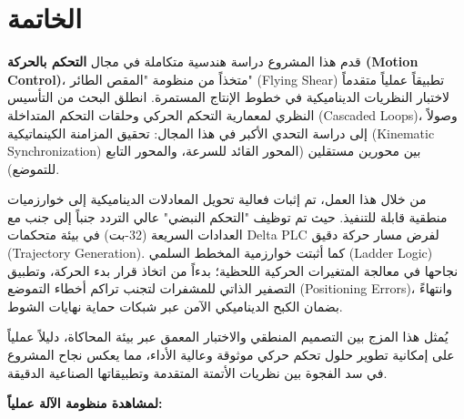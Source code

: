 \chapter{الخاتمة}
\label{ch:conclusion}


قدم هذا المشروع دراسة هندسية متكاملة في مجال \textbf{التحكم بالحركة (\textenglish{Motion Control})}، متخذاً من منظومة "المقص الطائر" (\textenglish{Flying Shear}) تطبيقاً عملياً متقدماً لاختبار النظريات الديناميكية في خطوط الإنتاج المستمرة. انطلق البحث من التأسيس النظري لمعمارية التحكم الحركي وحلقات التحكم المتداخلة (\textenglish{Cascaded Loops})، وصولاً إلى دراسة التحدي الأكبر في هذا المجال: تحقيق المزامنة الكينماتيكية (\textenglish{Kinematic Synchronization}) بين محورين مستقلين (المحور القائد للسرعة، والمحور التابع للتموضع).

من خلال هذا العمل، تم إثبات فعالية تحويل المعادلات الديناميكية إلى خوارزميات منطقية قابلة للتنفيذ. حيث تم توظيف "التحكم النبضي" عالي التردد جنباً إلى جنب مع العدادات السريعة (32-بت) في بيئة متحكمات \textenglish{Delta PLC} لفرض مسار حركة دقيق (\textenglish{Trajectory Generation}). كما أثبتت خوارزمية المخطط السلمي (\textenglish{Ladder Logic}) نجاحها في معالجة المتغيرات الحركية اللحظية؛ بدءاً من اتخاذ قرار بدء الحركة، وتطبيق التصفير الذاتي للمشفرات لتجنب تراكم أخطاء التموضع (\textenglish{Positioning Errors})، وانتهاءً بضمان الكبح الديناميكي الآمن عبر شبكات حماية نهايات الشوط.

يُمثل هذا المزج بين التصميم المنطقي والاختبار المعمق عبر بيئة المحاكاة، دليلاً عملياً على إمكانية تطوير حلول تحكم حركي موثوقة وعالية الأداء، مما يعكس نجاح المشروع في سد الفجوة بين نظريات الأتمتة المتقدمة وتطبيقاتها الصناعية الدقيقة.


\vspace{2cm}
\textbf{لمشاهدة منظومة الآلة عملياً:}
\begin{center}
\end{center}
